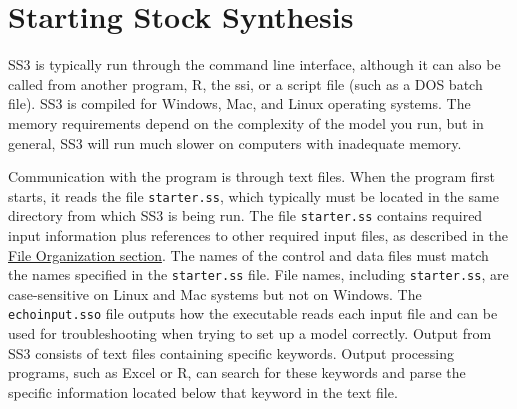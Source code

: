 \pagebreak

\hypertarget{StartingSS3}{}
\section{Starting Stock Synthesis}
SS3 is typically run through the command line interface, although it can also be called from another program, R, the \gls{ssi}, or a script file (such as a DOS batch file). SS3 is compiled for Windows, Mac, and Linux operating systems. The memory requirements depend on the complexity of the model you run, but in general, SS3 will run much slower on computers with inadequate memory. 

Communication with the program is through text files. When the program first starts, it reads the file \verb|starter.ss|, which typically must be located in the same directory from which SS3 is being run. The file \verb|starter.ss| contains required input information plus references to other required input files, as described in the \hyperlink{FileOrganization}{File Organization section}. The names of the control and data files must match the names specified in the \verb|starter.ss| file. File names, including \verb|starter.ss|, are case-sensitive on Linux and Mac systems but not on Windows. The \verb|echoinput.sso| file outputs how the executable reads each input file and can be used for troubleshooting when trying to set up a model correctly. Output from SS3 consists of text files containing specific keywords. Output processing programs, such as Excel or R, can search for these keywords and parse the specific information located below that keyword in the text file.

\pagebreak
